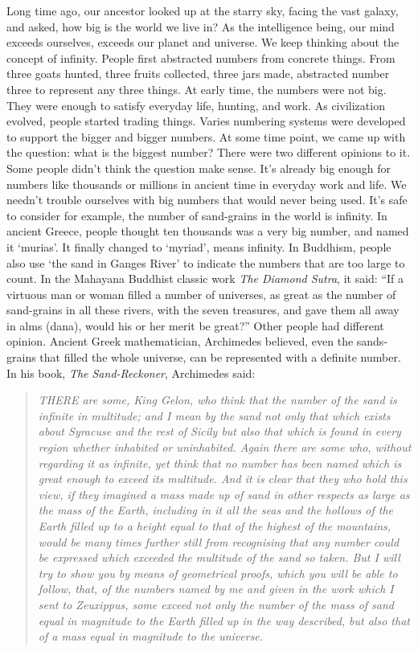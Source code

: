 \documentclass{article}
\begin{document}
Long time ago, our ancestor looked up at the starry sky, facing the vast galaxy, and asked, how big is the world we live in? As the intelligence being, our mind exceeds ourselves, exceeds our planet and universe. We keep thinking about the concept of infinity. People first abstracted numbers from concrete things. From three goats hunted, three fruits collected, three jars made, abstracted number three to represent any three things. At early time, the numbers were not big. They were enough to satisfy everyday life, hunting, and work. As civilization evolved, people started trading things. Varies numbering systems were developed to support the bigger and bigger numbers. At some time point, we came up with the question: what is the biggest number? There were two different opinions to it. Some people didn't think the question make sense. It's already big enough for numbers like thousands or millions in ancient time in everyday work and life. We needn't trouble ourselves with big numbers that would never being used. It's safe to consider for example, the number of sand-grains in the world is infinity. In ancient Greece, people thought ten thousands was a very big number, and named it `murias'. It finally changed to `myriad', means infinity\cite{De-linfini-2018}. In Buddhism, people also use `the sand in Ganges River' to indicate the numbers that are too large to count. In the Mahayana Buddhist classic work {\em The Diamond Sutra}, it said: ``If a virtuous man or woman filled a number of universes, as great as the number of sand-grains in all these rivers, with the seven treasures, and gave them all away in alms (dana), would his or her merit be great?'' Other people had different opinion. Ancient Greek mathematician, Archimedes believed, even the sands-grains that filled the whole universe, can be represented with a definite number. In his book, {\em The Sand-Reckoner}, Archimedes said:

\begin{quotation}
\itshape
THERE are some, King Gelon, who think that the number of the sand is infinite in multitude; and I mean by the sand not only that which exists about Syracuse and the rest of Sicily but also that which is found in every region whether inhabited or uninhabited. Again there are some who, without regarding it as infinite, yet think that no number has been named which is great enough to exceed its multitude. And it is clear that they who hold this view, if they imagined a mass made up of sand in other respects as large as the mass of the Earth, including in it all the seas and the hollows of the Earth filled up to a height equal to that of the highest of the mountains, would be many times further still from recognising that any number could be expressed which exceeded the multitude of the sand so taken. But I will try to show you by means of geometrical proofs, which you will be able to follow, that, of the numbers named by me and given in the work which I sent to Zeuxippus, some exceed not only the number of the mass of sand equal in magnitude to the Earth filled up in the way described, but also that of a mass equal in magnitude to the universe.
\end{quotation}
\end{document}
